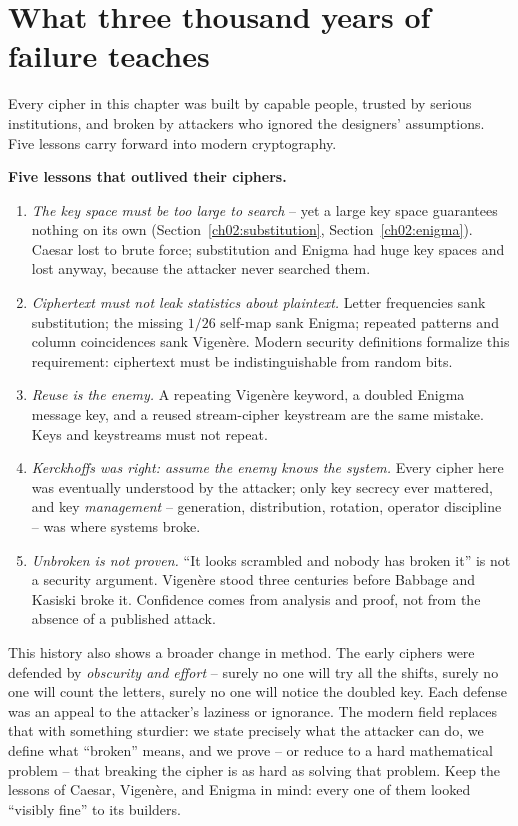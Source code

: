 \section{What three thousand years of failure teaches}
\label{ch02:lessons}

Every cipher in this chapter
was built by capable people, trusted by serious institutions, and broken by attackers who
ignored the designers' assumptions. Five lessons carry forward into modern cryptography.

\begin{focusbox}
\textbf{Five lessons that outlived their ciphers.}
\begin{enumerate}
  \item \emph{The key space must be too large to search} -- yet a large key space guarantees
        nothing on its own (Section~\ref{ch02:substitution}, Section~\ref{ch02:enigma}).
        Caesar lost to brute force; substitution and Enigma had huge key spaces and lost
        anyway, because the attacker never searched them.
  \item \emph{Ciphertext must not leak statistics about plaintext.} Letter frequencies sank
        substitution; the missing $1/26$ self-map sank Enigma; repeated patterns and column
        coincidences sank Vigen\`ere. Modern security definitions formalize this requirement:
        ciphertext must be indistinguishable from random bits.
  \item \emph{Reuse is the enemy.} A repeating Vigen\`ere keyword, a doubled Enigma message key,
        and a reused stream-cipher keystream are the same mistake. Keys and keystreams must not
        repeat.
  \item \emph{Kerckhoffs was right: assume the enemy knows the system.} Every cipher here was
        eventually understood by the attacker; only key secrecy ever mattered, and key
        \emph{management} -- generation, distribution, rotation, operator discipline -- was
        where systems broke.
  \item \emph{Unbroken is not proven.} ``It looks scrambled and nobody has broken it'' is not a
        security argument. Vigen\`ere stood three centuries before Babbage and Kasiski broke it.
        Confidence comes from analysis and proof, not from the absence of a published attack.
\end{enumerate}
\end{focusbox}

\begin{aestheticbox}
This history also shows a broader change in method. The early ciphers were defended by
\emph{obscurity and effort} -- surely no one will try all the shifts, surely no one will count
the letters, surely no one will notice the doubled key. Each defense was an appeal to the
attacker's laziness or ignorance. The modern field replaces that with something sturdier: we
state precisely what the attacker can do, we define what ``broken'' means, and we prove
-- or reduce to a hard mathematical problem -- that breaking the cipher is as hard as solving
that problem. Keep the lessons of Caesar, Vigen\`ere, and Enigma in mind: every one of them
looked ``visibly fine'' to its builders.
\end{aestheticbox}

